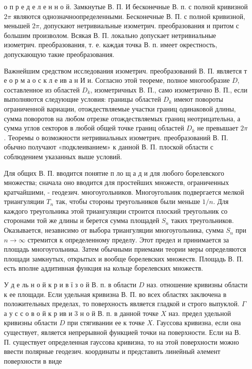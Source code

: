 \documentclass[10pt]{article}
\begin{document}
о п р е д е л е н н о й. Замкнутые В. П. И бесконечные В. п. с полной кривизной $2 \pi$ являются однозначноопределенными. Бесконечные В. П. с полной кривизной, меньшей $2 \pi$, допускают нетривиальные изометрич. преобразования и притом с большим произволом. Всякая В. П. локально допускает нетривиальные изометрич. преобразования, т. е. каждая точка В. п. имеет окрестность, допускающую такие преобразования.



Важнейшим средством исследования изометрич. преобразований В. П. является т е о р м а о с к л е ив а н И и. Согласно этой теореме, полное многообразие $D$, составленное из областей $D_{k}$, изометричных В. П., само изометрично В. П., если выполняются следующие условия: границы областей $D_{k}$ имеют повороты ограниченной вариации, отождествляемые участки границ одинаковой длины, сумма поворотов на любом отрезке отождествляемых границ неотрицательна, а сумма углов секторов в любой общей точке границ областей $D_{k}$ не превышает $2 \pi$. Теоремы о возможности нетривиальных изометрич. преобразований В. П. обычно получают «подклеиванием» к данной В. П. плоской области с соблюдением указанных выше условий.



Для общих В. П. вводится понятие п ло щ а д и для любого борелевского множества; сначала оно вводится для простейших множеств, ограниченных кратчайшими, - геодезич. многоугольников. Многоугольник подвергается мелкой триангуляции $T_{n}$ так, чтобы стороны треугольников были меньше $1 / n$. Для каждого треугольника этой триангуляции строится плоский треугольник со сторонами той же длины и берется сумма площадей $S_{n}$ таких треугольников. Оказывается, независимо от выбора триангуляции многоугольника, сумма $S_{n}$ при $n \rightarrow \infty$ стремится к определенному пределу. Этот предел и принимается за площадь многоугольника. Затем обычными приемами теории меры определяются площади замкнутых, открытых и вообще борелевских множеств. Площадь В. П. есть вполне аддитивная функция на кольце борелевских множеств.



У д е ль н о й к р и в ї з о й В. п. в области $D$ наз. отношение кривизны области к ее площади. Если удельная кривизна В. П. во всех областях заключена в положительных пределах, то поверхность является гладкой и строго выпуклой. $\Gamma$ а у с с о в о й к р ив и 3 н о й В. п. в данной точке $X$ наз. предел удельной кривизны области $D$ при стягивании ее к точке $X$. Гауссова кривизна, если она существует, является непрерывной функцией точки на поверхности. Если на В. П. существует определенная гауссова кривизна, то на этой поверхности можно ввести полярные геодезич. координаты и представить линейный әлемент поверхности в виде
\end{document}
